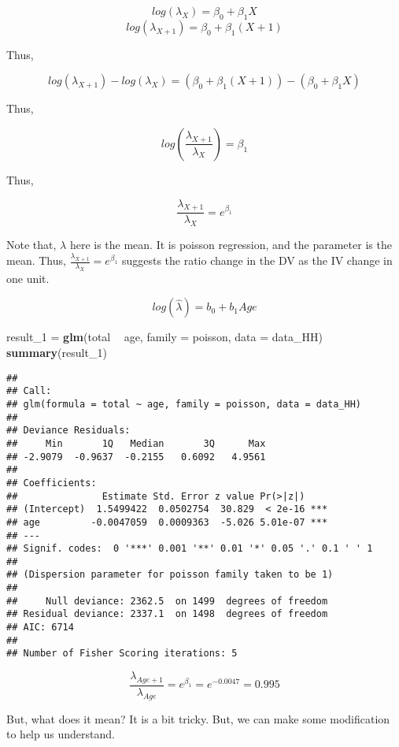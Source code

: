 \documentclass[]{book}
\newenvironment{Shaded}{\begin{snugshade}}{\end{snugshade}}
\newcommand{\DataTypeTok}[1]{\textcolor[rgb]{0.13,0.29,0.53}{#1}}
\newcommand{\DecValTok}[1]{\textcolor[rgb]{0.00,0.00,0.81}{#1}}
\newcommand{\KeywordTok}[1]{\textcolor[rgb]{0.13,0.29,0.53}{\textbf{#1}}}
\newcommand{\NormalTok}[1]{#1}
\newcommand{\OperatorTok}[1]{\textcolor[rgb]{0.81,0.36,0.00}{\textbf{#1}}}
\newcommand{\StringTok}[1]{\textcolor[rgb]{0.31,0.60,0.02}{#1}}
\begin{document}
\[log (\lambda_X) =\beta_0+\beta_1 X\]
\[log (\lambda_{X+1}) =\beta_0+\beta_1 (X+1)\]

Thus,

\[log (\lambda_{X+1})-log (\lambda_X) =(\beta_0+\beta_1 (X+1))-(\beta_0+\beta_1 X)\]

Thus,

\[log (\frac{\lambda_{X+1}}{\lambda_X}) =\beta_1\]

Thus,

\[\frac{\lambda_{X+1}}{\lambda_X} =e^{\beta_1}\]

Note that, \(\lambda\) here is the mean. It is poisson regression, and the parameter is the mean. Thus, \(\frac{\lambda_{X+1}}{\lambda_X} =e^{\beta_1}\) suggests the ratio change in the DV as the IV change in one unit.

\[log (\hat{\lambda}) =b_0+b_1 Age\]

\begin{Shaded}
\begin{Highlighting}[]
\NormalTok{result_}\DecValTok{1}\NormalTok{ =}\StringTok{ }\KeywordTok{glm}\NormalTok{(total }\OperatorTok{~}\StringTok{ }\NormalTok{age, }\DataTypeTok{family =}\NormalTok{ poisson, }\DataTypeTok{data =}\NormalTok{ data_HH)}
\KeywordTok{summary}\NormalTok{(result_}\DecValTok{1}\NormalTok{)}
\end{Highlighting}
\end{Shaded}

\begin{verbatim}
## 
## Call:
## glm(formula = total ~ age, family = poisson, data = data_HH)
## 
## Deviance Residuals: 
##     Min       1Q   Median       3Q      Max  
## -2.9079  -0.9637  -0.2155   0.6092   4.9561  
## 
## Coefficients:
##               Estimate Std. Error z value Pr(>|z|)    
## (Intercept)  1.5499422  0.0502754  30.829  < 2e-16 ***
## age         -0.0047059  0.0009363  -5.026 5.01e-07 ***
## ---
## Signif. codes:  0 '***' 0.001 '**' 0.01 '*' 0.05 '.' 0.1 ' ' 1
## 
## (Dispersion parameter for poisson family taken to be 1)
## 
##     Null deviance: 2362.5  on 1499  degrees of freedom
## Residual deviance: 2337.1  on 1498  degrees of freedom
## AIC: 6714
## 
## Number of Fisher Scoring iterations: 5
\end{verbatim}

\[\frac{\lambda_{Age+1}}{\lambda_{Age}} =e^{\beta_1}=e^{-0.0047}=0.995\]

But, what does it mean? It is a bit tricky. But, we can make some modification to help us understand.
\end{document}

